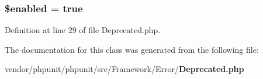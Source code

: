 \subsubsection[{\$enabled}]{\setlength{\rightskip}{0pt plus 5cm}\$enabled = true\hspace{0.3cm}{\ttfamily [static]}}\label{class_p_h_p_unit___framework___error___deprecated_a8d376199cc641e3e7af6e1a0d5c736d9}


Definition at line 29 of file Deprecated.\+php.



The documentation for this class was generated from the following file\+:\begin{DoxyCompactItemize}
\item 
vendor/phpunit/phpunit/src/\+Framework/\+Error/{\bf Deprecated.\+php}\end{DoxyCompactItemize}
